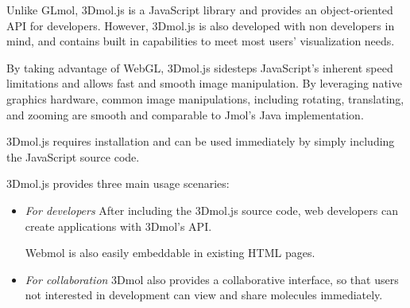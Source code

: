 \documentclass[]{bioinfo}
\begin{document}
Unlike GLmol, 3Dmol.js is a JavaScript library and provides an object-oriented API for developers.  However, 3Dmol.js is also developed with non developers in mind, and contains built in capabilities to meet most users' visualization needs.

By taking advantage of WebGL, 3Dmol.js sidesteps JavaScript's inherent speed limitations and allows fast and smooth image manipulation.  By leveraging native graphics hardware, common image manipulations, including rotating, translating, and zooming are smooth and comparable to Jmol's Java implementation.

3Dmol.js requires installation and can be used immediately by simply including the JavaScript source code.

3Dmol.js provides three main usage scenaries:

\begin{itemize}
\item \emph{For developers}
After including the 3Dmol.js source code, web developers can create applications with 3Dmol's API.

Webmol is also easily embeddable in existing HTML pages.

\item \emph{For collaboration}
3Dmol also provides a collaborative interface, so that users not interested in development can view and share molecules immediately.

\end{itemize}
\end{document}
